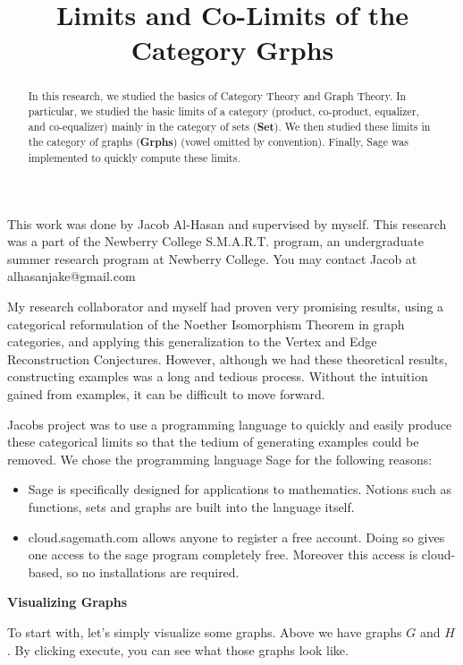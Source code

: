 \documentclass{ximera}
\title{Limits and Co-Limits of the Category Grphs}
\begin{document}
      
\begin{abstract}
      
In this research, we studied the basics of Category Theory and Graph Theory. In particular, we studied the basic limits of a category (product, co-product, equalizer, and co-equalizer) mainly in the category of sets (\textbf{Set}). We then studied these limits in the category of graphs (\textbf{Grphs}) (vowel omitted by convention). Finally, Sage was implemented to quickly compute these limits.      
\end{abstract}
      
\maketitle

This work was done by Jacob Al-Hasan and supervised by myself.  This research was a part of the Newberry College S.M.A.R.T. program, an undergraduate summer research program at Newberry College.  You may contact Jacob at alhasanjake@gmail.com

My research collaborator and myself had proven very promising results, using a categorical reformulation of the Noether Isomorphism Theorem in graph categories, and applying this generalization to the Vertex and Edge Reconstruction Conjectures.  However, although we had these theoretical results, constructing examples was a long and tedious process.  Without the intuition gained from examples, it can be difficult to move forward.

Jacobs project was to use a programming language to quickly and easily produce these categorical limits so that the tedium of generating examples could be removed.  We chose the programming language Sage for the following reasons:

\begin{itemize}
 \item   Sage is specifically designed for applications to mathematics.  Notions such as functions, sets and graphs are built into the language itself.
 \item   cloud.sagemath.com allows anyone to register a free account.  Doing so gives one access to the sage program completely free.  Moreover this access is cloud-based, so no installations are required.

\end{itemize}

\textbf{Visualizing Graphs}      

 To start with, let's simply visualize some graphs.  Above we have graphs $G$ and $H$.  By clicking execute, you can see what those graphs look like.
\end{document}
